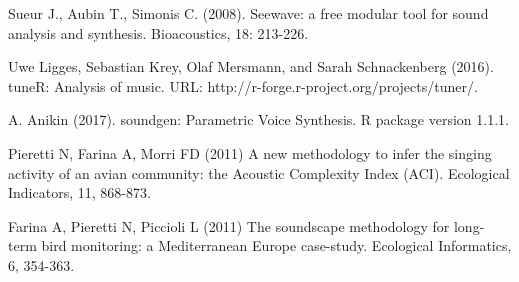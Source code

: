 
\begin{thebibliography}{00}

Sueur J., Aubin T., Simonis C. (2008). 
\newblock Seewave: a free modular tool for sound analysis and synthesis. 
\newblock Bioacoustics, 18: 213-226.

Uwe Ligges, Sebastian Krey, Olaf Mersmann, and Sarah Schnackenberg (2016). 
\newblock tuneR: Analysis of music. 
\newblock URL: http://r-forge.r-project.org/projects/tuner/.

A. Anikin (2017). 
\newblock soundgen: Parametric Voice Synthesis. 
\newblock R package version 1.1.1.

Pieretti N, Farina A, Morri FD (2011) 
\newblock A new methodology to infer the singing activity of an avian community: the Acoustic Complexity Index (ACI). 
\newblock Ecological Indicators, 11, 868-873.

Farina A, Pieretti N, Piccioli L (2011) 
\newblock The soundscape methodology for long-term bird monitoring: a Mediterranean Europe case-study. 
\newblock Ecological Informatics, 6, 354-363.

\end{thebibliography}


